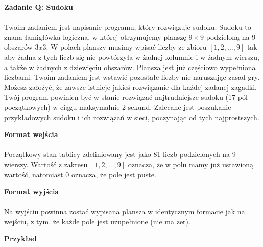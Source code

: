 \documentclass[
  fontsize=12pt  %
 ,english        %
 ,headinclude    %
 ,headsepline    %
]{scrbook}       %
\begin{document}
\vspace{50 mm}
\hspace{50 mm}
\newline

\par{\Large \textbf{Zadanie Q: Sudoku}} \\ \\
Twoim zadaniem jest napisanie programu, który rozwiązuje sudoku. Sudoku to znana łamigłówka logiczna, w której otrzymujemy planszę $9 \times 9$ podzieloną na 9 obszarów $3 x 3$. W polach planszy musimy wpisać liczby ze zbioru $[1, 2, \ldots, 9]$ tak aby żadna z tych liczb się nie powtórzyła w żadnej kolumnie i w żadnym wierszu, a także w żadnych z dziewięciu obszarów. Plansza jest już częściowo wypełniona liczbami. Twoim zadaniem jest wstawić pozostałe liczby nie naruszając zasad gry. Możesz założyć, że zawsze istnieje jakieś rozwiązanie dla każdej zadanej zagadki.
Twój program powinien być w stanie rozwiązać najtrudniejsze sudoku (17 pól początkowych) w ciągu maksymalnie 2 sekund. Zalecane jest poszukanie przykładowych sudoku i ich rozwiązań w sieci, poczynając od tych najprostszych. \\
\par{\Large \textbf{Format wejścia}} \\ \\
Początkowy stan tablicy zdefiniowany jest jako 81 liczb podzielonych na 9 wierszy. Wartość z zakresu $[1, 2, \ldots, 9]$ oznacza, że w polu mamy już ustawioną wartość, natomiast $0$ oznacza, że pole jest puste.
\\ 
\par{\Large \textbf{Format wyjścia}} \\ \\
Na wyjściu powinna zostać wypisana plansza w identycznym formacie jak na wejściu, z tym, że każde pole jest uzupełnione (nie ma zer).
\\ 
\par{\Large \textbf{Przykład}} \\ \\
\end{document}
